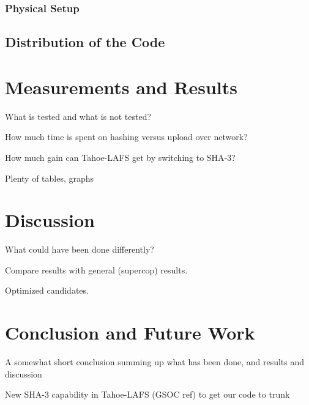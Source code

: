 \documentclass[english,12pt,a4paper]{book}
\begin{document}
\subsection{Physical Setup}

\section{Distribution of the Code}

\chapter{Measurements and Results}

What is tested and what is not tested?

How much time is spent on hashing versus upload over network?

How much gain can Tahoe-LAFS get by switching to SHA-3?

Plenty of tables, graphs

\chapter{Discussion}

What could have been done differently?

Compare results with general (supercop) results.

Optimized candidates.

\chapter{Conclusion and Future Work}

A somewhat short conclusion summing up what has been done, and results and
discussion

New SHA-3 capability in Tahoe-LAFS (GSOC ref) to get our code to trunk






\end{document}
